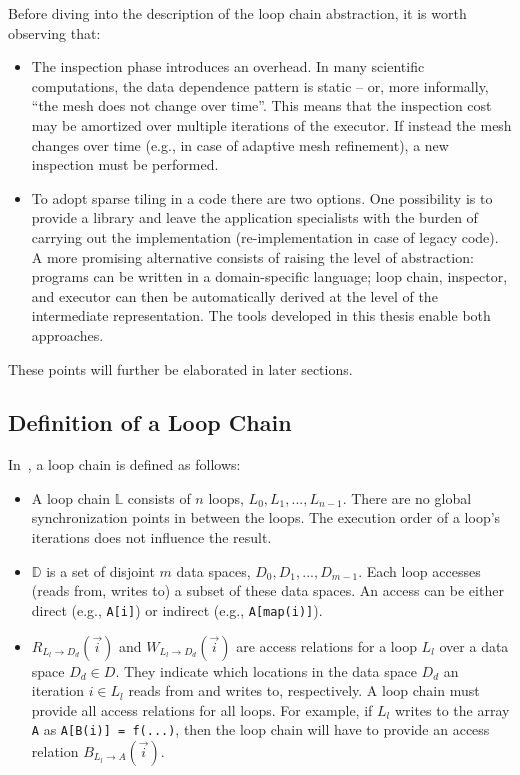 Before diving into the description of the loop chain abstraction, it is worth observing that:
\begin{itemize}
\item The inspection phase introduces an overhead. In many scientific computations, the data dependence pattern is static -- or, more informally, ``the mesh does not change over time''. This means that the inspection cost may be amortized over multiple iterations of the executor. If instead the mesh changes over time (e.g., in case of adaptive mesh refinement), a new inspection must be performed. 
\item To adopt sparse tiling in a code there are two options. One possibility is to provide a library and leave the application specialists with the burden of carrying out the implementation (re-implementation in case of legacy code). A more promising alternative consists of raising the level of abstraction: programs can be written in a domain-specific language; loop chain, inspector, and executor can then be automatically derived at the level of the intermediate representation. The tools developed in this thesis enable both approaches.
\end{itemize}
These points will further be elaborated in later sections.

\subsection{Definition of a Loop Chain}
In~\cite{ST-KriegerHIPS2013}, a loop chain is defined as follows:
\begin{itemize}
\item A loop chain $\mathbb{L}$ consists of $n$ loops, $L_0, L_1, ..., L_{n-1}$. There are no global synchronization points in between the loops. The execution order of a loop's iterations does not influence the result.
\item $\mathbb{D}$ is a set of disjoint $m$ data spaces, $D_0, D_1, ..., D_{m-1}$. Each loop accesses (reads from, writes to) a subset of these data spaces. An access can be either direct (e.g., \texttt{A[i]}) or indirect (e.g., \texttt{A[map(i)]}).
\item $R_{L_l\rightarrow D_d}(\vec{i})$ and $W_{L_l\rightarrow D_d}(\vec{i})$ are access relations for a loop $L_l$ over a data space $D_d \in D$. They indicate which locations in the data space $D_d$ an iteration $i \in L_l$ reads from and writes to, respectively. A loop chain must provide all access relations for all loops. For example, if $L_l$ writes to the array {\tt A} as {\tt A[B(i)] = f(...)}, then the loop chain will have to provide an access relation $B_{L_l\rightarrow A}(\vec{i})$. 
\end{itemize}

